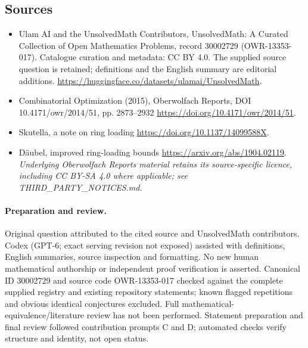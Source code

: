 \documentclass[11pt]{article}
\begin{document}
\subsection{Sources}
\begin{itemize}
\item[\hypertarget{source:30002729:1}{S1}] Ulam AI and the UnsolvedMath Contributors, UnsolvedMath: A Curated Collection of Open Mathematics Problems, record 30002729 (OWR-13353-017). Catalogue curation and metadata: CC BY 4.0. The supplied source question is retained; definitions and the English summary are editorial additions.
\url{https://huggingface.co/datasets/ulamai/UnsolvedMath}.
\item[\hypertarget{source:30002729:2}{S2}] Combinatorial Optimization (2015), Oberwolfach Reports, DOI 10.4171/owr/2014/51, pp. 2873--2932
\url{https://doi.org/10.4171/owr/2014/51}.
\item[\hypertarget{source:30002729:3}{S3}] Skutella, a note on ring loading
\url{https://doi.org/10.1137/14099588X}.
\item[\hypertarget{source:30002729:4}{S4}] Däubel, improved ring-loading bounds
\url{https://arxiv.org/abs/1904.02119}.
\textit{Underlying Oberwolfach Reports material retains its source-specific licence, including CC BY-SA 4.0 where applicable; see THIRD\_PARTY\_NOTICES.md.}
\end{itemize}
\paragraph{Preparation and review.}
Original question attributed to the cited source and UnsolvedMath contributors. Codex (GPT-6; exact serving revision not exposed) assisted with definitions, English summaries, source inspection and formatting. No new human mathematical authorship or independent proof verification is asserted. Canonical ID 30002729 and source code OWR-13353-017 checked against the complete supplied registry and existing repository statements; known flagged repetitions and obvious identical conjectures excluded. Full mathematical-equivalence/literature review has not been performed. Statement preparation and final review followed contribution prompts C and D; automated checks verify structure and identity, not open status.
\label{end:30002729}
\end{document}
